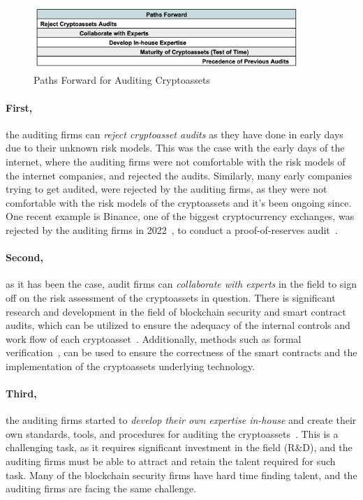 \begin{figure}[h]\label{fig:pathsforward}
    \centering
    \includegraphics[width=0.9\textwidth]{figures/audit_pathsforward.png}
    \caption[Paths Forward for Auditing Cryptoassets]{Paths Forward for Auditing Cryptoassets}
\end{figure}	


\paragraph{First,} the auditing firms can \textit{reject cryptoasset audits} as they have done in early days due to their unknown risk models. This was the case with the early days of the internet, where the auditing firms were not comfortable with the risk models of the internet companies, and rejected the audits. Similarly, many early companies trying to get audited, were rejected by the auditing firms, as they were not comfortable with the risk models of the cryptoassets and it's been ongoing since. One recent example is Binance, one of the biggest cryptocurrency exchanges, was rejected by the auditing firms in 2022~\cite{binanceauditorrejection}, to conduct a proof-of-reserves audit~\cite{dagher2015provisions}.

\paragraph{Second,} as it has been the case, audit firms can \textit{collaborate with experts} in the field to sign off on the risk assessment of the cryptoassets in question. There is significant research and development in the field of blockchain security and smart contract audits, which can be utilized to ensure the adequacy of the internal controls and work flow of each cryptoasset~\cite{krakenproofofreserve}. Additionally, methods such as formal verification~\cite{clark2018sok8}, can be used to ensure the correctness of the smart contracts and the implementation of the cryptoassets underlying technology. 

\paragraph{Third,} the auditing firms started to \textit{develop their own expertise in-house} and create their own standards, tools, and procedures for auditing the cryptoassets~\cite{eyInternalTools,delloiteinternalauditor}. This is a challenging task, as it requires significant investment in the field (R\&D), and the auditing firms must be able to attract and retain the talent required for such task. Many of the blockchain security firms have hard time finding talent, and the auditing firms are facing the same challenge. 

